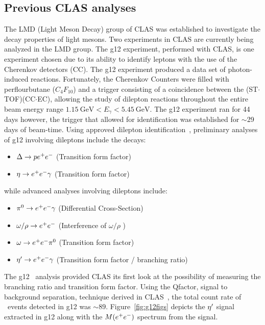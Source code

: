 	\subsection{Previous CLAS analyses}
	The LMD (Light Meson Decay) group of CLAS was established to investigate the decay properties of light mesons. Two experiments in CLAS are currently being analyzed in the LMD group. The g12 experiment, performed with CLAS, is one experiment chosen due to its ability to identify leptons with the use of the Cherenkov detectors (CC).
	The g12 experiment produced a data set of photon-induced reactions. Fortunately, the Cherenkov Counters were filled with perflourbutane ($C_4F_{10}$) and a trigger consisting of a coincidence between the (ST$\cdot$TOF)(CC$\cdot$EC), allowing the study of dilepton reactions throughout the entire beam energy range $1.15 \ \mathrm{GeV}<E_\gamma <5.45 \ \mathrm{GeV}$. The g12 experiment ran for 44 days however, the trigger that allowed for \epemT identification was established for $\sim$29 days of beam-time. Using approved dilepton identification~\cite{g12note}, preliminary analyses of g12 involving dileptons include the decays:
	\begin{itemize}
		\item $\Delta \to p e^+e^-$ (Transition form factor)
		\item $\eta \to e^+e^- \gamma$ (Transition form factor)
	\end{itemize}
	while advanced analyses involving dileptons include:
	\begin{itemize}
		\item $\pi^{0} \to e^+e^- \gamma$ (Differential Cross-Section)
		\item $\omega / \rho \to e^+e^-$ (Interference of $\omega/\rho$ )
		\item $\omega \to e^+e^- \pi^{0}$ (Transition form factor)
		\item $\eta^{\prime} \to e^+e^- \gamma$ (Transition form factor / branching ratio)
	\end{itemize}
	The g12 \etaPDal \ analysis provided CLAS its first look at the possibility of measuring the branching ratio and transition form factor. Using the Qfactor, signal to background separation, technique derived in CLAS~\cite{qfactor}, the total count rate of \etaPDal \ events detected in g12 was $\sim 89$. Figure~\ref{fig:g12figs} depicts the $\eta^{\prime}$ signal extracted in g12 along with the $M(e^+e^-)$ spectrum from the signal. 
